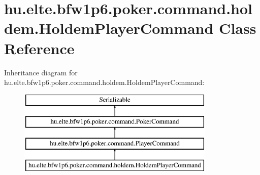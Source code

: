 \hypertarget{classhu_1_1elte_1_1bfw1p6_1_1poker_1_1command_1_1holdem_1_1_holdem_player_command}{}\section{hu.\+elte.\+bfw1p6.\+poker.\+command.\+holdem.\+Holdem\+Player\+Command Class Reference}
\label{classhu_1_1elte_1_1bfw1p6_1_1poker_1_1command_1_1holdem_1_1_holdem_player_command}
Inheritance diagram for hu.\+elte.\+bfw1p6.\+poker.\+command.\+holdem.\+Holdem\+Player\+Command\+:\begin{figure}[H]
\begin{center}
\leavevmode
\includegraphics[height=4.000000cm]{classhu_1_1elte_1_1bfw1p6_1_1poker_1_1command_1_1holdem_1_1_holdem_player_command}
\end{center}
\end{figure}
